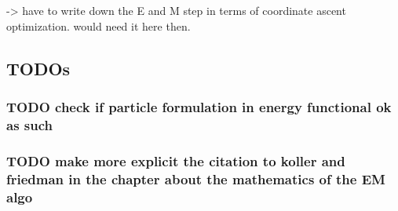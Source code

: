 \documentclass[11pt]{article}
\begin{document}
-> have to write down the E and M step in terms of coordinate
ascent optimization. would need it here then.




\newpage





\subsection{TODOs}
\label{sec:org960a864}

\subsubsection{{\bfseries\sffamily TODO} check if particle formulation in energy functional ok as such}
\label{sec:orgd936bd0}

\subsubsection{{\bfseries\sffamily TODO} make more explicit the citation to koller and friedman in the chapter about the mathematics of the EM algo}
\label{sec:orgc21f04d}
\end{document}
